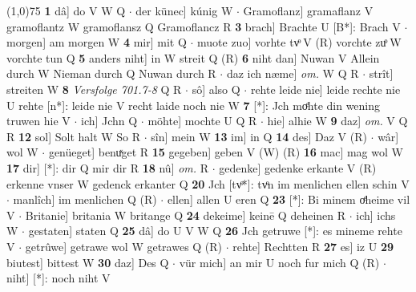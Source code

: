 \documentclass[8pt,a4paper,notitlepage]{article}
\begin{document}
\begin{table}[ht]
\begin{minipage}[t]{0.5\linewidth}
\line(1,0){75} \newline
\textbf{1} dâ] do V W Q  $\cdot$ der künec] kúnig W  $\cdot$ Gramoflanz] gramaflanz V gramoflantz W gramoflansz Q Gramoflancz R \textbf{3} brach] Brachte U [B*]: Brach V  $\cdot$ morgen] am morgen W \textbf{4} mir] mit Q  $\cdot$ muote zuo] vorhte tvͦ V (R) vorchte zuͦ W vorchte tun Q \textbf{5} anders niht] in W streit Q (R) \textbf{6} niht dan] Nuwan V Allein durch W Nieman durch Q Nuwan durch R  $\cdot$ daz ich næme] \textit{om.} W Q R  $\cdot$ strît] streiten W \textbf{8} \textit{Versfolge 701.7-8} Q R   $\cdot$ sô] also Q  $\cdot$ rehte leide nie] leide rechte nie U rehte [n*]: leide nie V recht laide noch nie W \textbf{7} [*]: Jch moͤhte din wening truwen hie V  $\cdot$ ich] Jchn Q  $\cdot$ möhte] mochte U Q R  $\cdot$ hie] alhie W \textbf{9} daz] \textit{om.} V Q R \textbf{12} sol] Solt halt W So R  $\cdot$ sîn] mein W \textbf{13} im] in Q \textbf{14} des] Daz V (R)  $\cdot$ wâr] wol W  $\cdot$ genüeget] benuͯget R \textbf{15} gegeben] geben V (W) (R) \textbf{16} mac] mag wol W \textbf{17} dir] [*]: dir Q mir dir R \textbf{18} nû] \textit{om.} R  $\cdot$ gedenke] gedenke erkante V (R) erkenne vnser W gedenck erkanter Q \textbf{20} Jch [tvͦ*]: tvͦn im menlichen ellen schin V  $\cdot$ manlîch] im menlichen Q (R)  $\cdot$ ellen] allen U eren Q \textbf{23} [*]: Bi minem oͤheime vil V  $\cdot$ Britanie] britania W britange Q \textbf{24} dekeime] keinē Q deheinen R  $\cdot$ ich] ichs W  $\cdot$ gestaten] staten Q \textbf{25} dâ] do U V W Q \textbf{26} Jch getruwe [*]: es mineme rehte V  $\cdot$ getrûwe] getrawe wol W getrawes Q (R)  $\cdot$ rehte] Rechtten R \textbf{27} es] iz U \textbf{29} biutest] bittest W \textbf{30} daz] Des Q  $\cdot$ vür mich] an mir U noch fur mich Q (R)  $\cdot$ niht] [*]: noch niht V \newline
\end{minipage}
\end{table}
\end{document}
